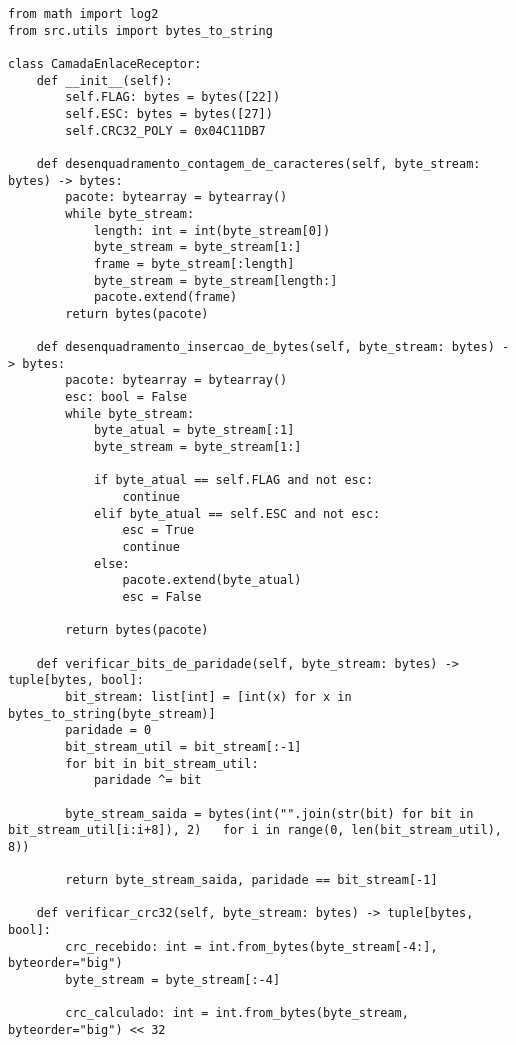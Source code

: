 \documentclass[12pt, a4paper]{article}
\newenvironment{code}{\captionsetup{type=listing}}{}
\begin{document}
\begin{code}
\begin{verbatim}
from math import log2
from src.utils import bytes_to_string

class CamadaEnlaceReceptor:
    def __init__(self):
        self.FLAG: bytes = bytes([22])
        self.ESC: bytes = bytes([27])
        self.CRC32_POLY = 0x04C11DB7

    def desenquadramento_contagem_de_caracteres(self, byte_stream: bytes) -> bytes:
        pacote: bytearray = bytearray()
        while byte_stream:
            length: int = int(byte_stream[0])
            byte_stream = byte_stream[1:]
            frame = byte_stream[:length]
            byte_stream = byte_stream[length:]
            pacote.extend(frame)
        return bytes(pacote)
    
    def desenquadramento_insercao_de_bytes(self, byte_stream: bytes) -> bytes:
        pacote: bytearray = bytearray()
        esc: bool = False
        while byte_stream:
            byte_atual = byte_stream[:1]
            byte_stream = byte_stream[1:]
            
            if byte_atual == self.FLAG and not esc:
                continue
            elif byte_atual == self.ESC and not esc:
                esc = True
                continue
            else:
                pacote.extend(byte_atual)
                esc = False
            
        return bytes(pacote)

    def verificar_bits_de_paridade(self, byte_stream: bytes) -> tuple[bytes, bool]:
        bit_stream: list[int] = [int(x) for x in bytes_to_string(byte_stream)]
        paridade = 0
        bit_stream_util = bit_stream[:-1]
        for bit in bit_stream_util:
            paridade ^= bit
            
        byte_stream_saida = bytes(int("".join(str(bit) for bit in bit_stream_util[i:i+8]), 2)   for i in range(0, len(bit_stream_util), 8))
        
        return byte_stream_saida, paridade == bit_stream[-1]
        
    def verificar_crc32(self, byte_stream: bytes) -> tuple[bytes, bool]:
        crc_recebido: int = int.from_bytes(byte_stream[-4:], byteorder="big")
        byte_stream = byte_stream[:-4]

        crc_calculado: int = int.from_bytes(byte_stream, byteorder="big") << 32
        

\end{verbatim}
\end{code}
\end{document}
